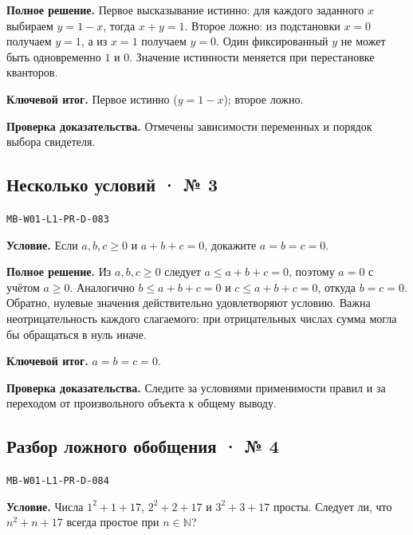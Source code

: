 \documentclass[11pt,a4paper,openany]{book}
\newcommand{\muid}[1]{\texttt{\footnotesize #1}}
\begin{document}
\textbf{Полное решение.} Первое высказывание истинно: для каждого заданного $x$ выбираем $y=1-x$, тогда $x+y=1$. Второе ложно: из подстановки $x=0$ получаем $y=1$, а из $x=1$ получаем $y=0$. Один фиксированный $y$ не может быть одновременно $1$ и $0$. Значение истинности меняется при перестановке кванторов.


\begin{learnbox}\textbf{Ключевой итог.} Первое истинно ($y=1-x$); второе ложно.\par \textbf{Проверка доказательства.} 
Отмечены зависимости переменных и порядок выбора свидетеля. 
\end{learnbox}

\subsection*{Несколько условий · № 3}\hypertarget{solution:MB-W01-L1-PR-D-083}{}

\muid{MB-W01-L1-PR-D-083}\par

\textbf{Условие.} Если $a,b,c\ge0$ и $a+b+c=0$, докажите $a=b=c=0$.\par

\textbf{Полное решение.} Из $a,b,c\ge0$ следует $a\le a+b+c=0$, поэтому $a=0$ с учётом $a\ge0$. Аналогично $b\le a+b+c=0$ и $c\le a+b+c=0$, откуда $b=c=0$. Обратно, нулевые значения действительно удовлетворяют условию. Важна неотрицательность каждого слагаемого: при отрицательных числах сумма могла бы обращаться в нуль иначе.


\begin{learnbox}\textbf{Ключевой итог.} $a=b=c=0$.\par \textbf{Проверка доказательства.} 
Следите за условиями применимости правил и за переходом от произвольного объекта к общему выводу. 
\end{learnbox}

\subsection*{Разбор ложного обобщения · № 4}\hypertarget{solution:MB-W01-L1-PR-D-084}{}

\muid{MB-W01-L1-PR-D-084}\par

\textbf{Условие.} Числа $1^2+1+17$, $2^2+2+17$ и $3^2+3+17$ просты. Следует ли, что $n^2+n+17$ всегда простое при $n\in\mathbb N$?\par
\end{document}
